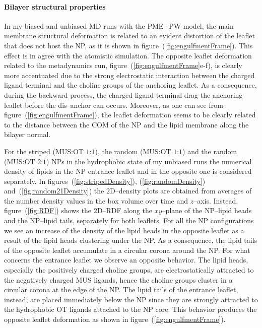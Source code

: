 \paragraph{\textbf{Bilayer structural properties}}
In my biased and unbiased \ac{MD} runs with the \martini \ac{PME}$+$\ac{PW} model, the main membrane structural deformation is related to an evident distortion of the leaflet that does not host the \ac{NP}, as it is shown in figure~(\ref{fig:engulfmentFrame}). This effect is in agree with the atomistic simulation. The opposite leaflet deformation related to the metadynamics run, figure~(\ref{fig:engulfmentFrame}e-f), is clearly more accentuated due to the strong electrostatic interaction between the charged ligand terminal and the choline groups of the anchoring leaflet. As a consequence, during the backward process, the charged ligand terminal drag the anchoring leaflet before the dis--anchor can occurs. Moreover, as one can see from figure~(\ref{fig:engulfmentFrame}), the leaflet deformation seems to be clearly related to the distance between the \ac{COM} of the \ac{NP} and the lipid membrane along the bilayer normal.

For the striped (\ac{MUS}:\ac{OT} $1$:$1$), the random (\ac{MUS}:\ac{OT} $1$:$1$) and the random (\ac{MUS}:\ac{OT} $2$:$1$) \acp{NP} in the hydrophobic state of my unbiased runs the numerical density of lipids in the \ac{NP} entrance leaflet and in the opposite one is considered separately. In figures~(\ref{fig:stripedDensity}), (\ref{fig:randomDensity}) and~(\ref{fig:random21Density}) the $2$D--density plots are obtained from averages of the number density values in the box volume over time and $z$--axis. Instead, figure~(\ref{fig:RDF}) shows the $2$D--\ac{RDF} along the $xy$--plane of the \ac{NP}--lipid heads and the \ac{NP}--lipid tails, separately for both leaflets. For all the \ac{NP} configurations we see an increase of the density of the lipid heads in the opposite leaflet as a result of the lipid heads clustering under the \ac{NP}. As a consequence, the lipid tails of the opposite leaflet accumulate in a circular corona around the \ac{NP}. For what concerns the entrance leaflet we observe an opposite behavior. The lipid heads, especially the positively charged choline groups, are electrostatically attracted to the negatively charged \ac{MUS} ligands, hence the choline groups cluster in a circular corona at the edge of the \ac{NP}. The lipid tails of the entrance leaflet, instead, are placed immediately below the \ac{NP} since they are strongly attracted to the hydrophobic \ac{OT} ligands attached to the \ac{NP} core. This behavior produces the opposite leaflet deformation as shown in figure~(\ref{fig:engulfmentFrame}). 

